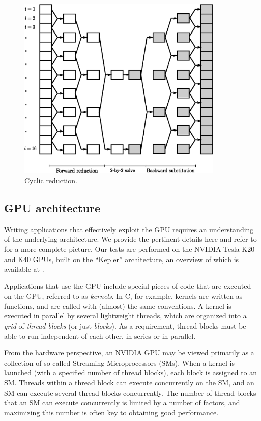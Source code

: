 \documentclass{elsarticle}
\begin{document}
\begin{figure}
\begin{center}
\includegraphics[height=250pt]{img/cyclic-reduction.eps}
\end{center}
\caption{Cyclic reduction.}
\label{fig:cyclic-reduction}
\end{figure}

\subsection{GPU architecture} \label{subsec:gpu-architecture}

Writing applications that effectively exploit the GPU
requires an understanding of the underlying architecture.
We provide the pertinent details here
and refer to \cite{GPUcomputingera} for a more complete picture.
Our tests are performed on the NVIDIA Tesla K20 and K40 GPUs,
built on the ``Kepler'' architecture,
an overview of which is available at \cite{Keplerwhitepaper}.

Applications that use the GPU include special
pieces of code that are executed on the GPU,
referred to as \emph{kernels}.
In C, for example, kernels are written as functions,
and are called with (almost) the same conventions.
A kernel is executed in parallel by several lightweight threads,
which are organized into a \emph{grid} of \emph{thread blocks}
(or just \emph{blocks}).
As a requirement, thread blocks must be able to run
independent of each other,
in series or in parallel.

From the hardware perspective, an NVIDIA GPU may be viewed primarily as
a collection of so-called Streaming Microprocessors (SMs).
When a kernel is launched (with a specified number of thread blocks),
each block is assigned to an SM.
Threads within a thread block can execute concurrently on the SM,
and an SM can execute several thread blocks concurrently.
The number of thread blocks that an SM can execute concurrently
is limited by a number of factors,
and maximizing this number is often key to obtaining good performance.
\end{document}
